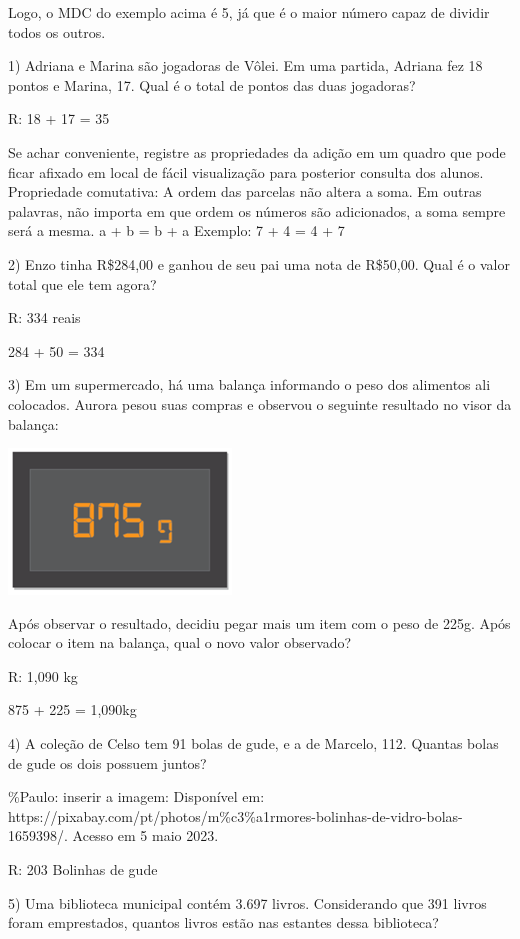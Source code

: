Logo, o MDC do exemplo acima é 5, já que é o maior número capaz de
dividir todos os outros.


1) Adriana e Marina são jogadoras de Vôlei. Em uma partida, Adriana fez
18 pontos e Marina, 17. Qual é o total de pontos das duas jogadoras?

R: 18 + 17 = 35

Se achar conveniente, registre as propriedades da adição em um quadro
que pode ficar afixado em local de fácil visualização para posterior
consulta dos alunos. Propriedade comutativa: A ordem das parcelas não
altera a soma. Em outras palavras, não importa em que ordem os números
são adicionados, a soma sempre será a mesma. a + b = b + a Exemplo: 7 +
4 = 4 + 7

2) Enzo tinha R\$284,00 e ganhou de seu pai uma nota de R\$50,00. Qual é
o valor total que ele tem agora?

R: 334 reais

284 + 50 = 334

3) Em um supermercado, há uma balança informando o peso dos alimentos
ali colocados. Aurora pesou suas compras e observou o seguinte resultado
no visor da balança:

\includegraphics[width=2.33333in,height=1.53125in]{./imgSAEB_6_MAT/media/image23.png}

Após observar o resultado, decidiu pegar mais um item com o peso de
225g. Após colocar o item na balança, qual o novo valor observado?

R: 1,090 kg

875 + 225 = 1,090kg

4) A coleção de Celso tem 91 bolas de gude, e a de Marcelo, 112. Quantas
bolas de gude os dois possuem juntos?

\%Paulo: inserir a imagem: Disponível em:
https://pixabay.com/pt/photos/m\%c3\%a1rmores-bolinhas-de-vidro-bolas-1659398/.
Acesso em 5 maio 2023.

R: 203 Bolinhas de gude

5) Uma biblioteca municipal contém 3.697 livros. Considerando que 391
livros foram emprestados, quantos livros estão nas estantes dessa
biblioteca?

